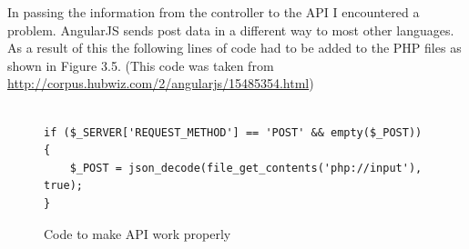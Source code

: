 In passing the information from the controller to the API I encountered a problem. AngularJS sends post data in a different way to most other languages. As a result of this the following lines of code had to be added to the PHP files as shown in Figure 3.5. (This code was taken from \url{http://corpus.hubwiz.com/2/angularjs/15485354.html})
\begin{center} 
\begin{figure}[H]
\begin{verbatim}

if ($_SERVER['REQUEST_METHOD'] == 'POST' && empty($_POST)) {
    $_POST = json_decode(file_get_contents('php://input'), true);
}
\end{verbatim}
\caption{Code to make API work properly}
\end{figure}
\end{center}

